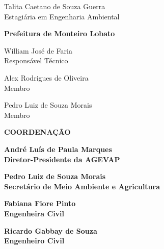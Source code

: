 \begin{flushleft}
	{Talita Caetano de Souza Guerra\\
	Estagiária em Engenharia Ambiental}\vspace{1em}

	\textbf{Prefeitura de Monteiro Lobato}\vspace{1em}
	
	{William José de Faria\\
	Responsável Técnico}
	
	{Alex Rodrigues de Oliveira\\
	Membro}

	{Pedro Luiz de Souza Morais\\
	Membro}
\end{flushleft}
\vspace{\fill}

\begin{flushright}
{\bfseries\Large\flushleft\MakeUppercase{Coordenação}}\vspace{1.5em}

	\textbf{André Luís de Paula Marques\\
	Diretor-Presidente da AGEVAP}\vspace{1em}

\textbf{Pedro Luiz de Souza Morais\\
	Secretário de Meio Ambiente e Agricultura}\vspace{1em}

	\textbf{Fabiana Fiore Pinto\\
	Engenheira Civil}\vspace{1em}

\textbf{Ricardo Gabbay de Souza\\
	Engenheiro Civil}\vspace{1em}
\end{flushright}
\clearpage